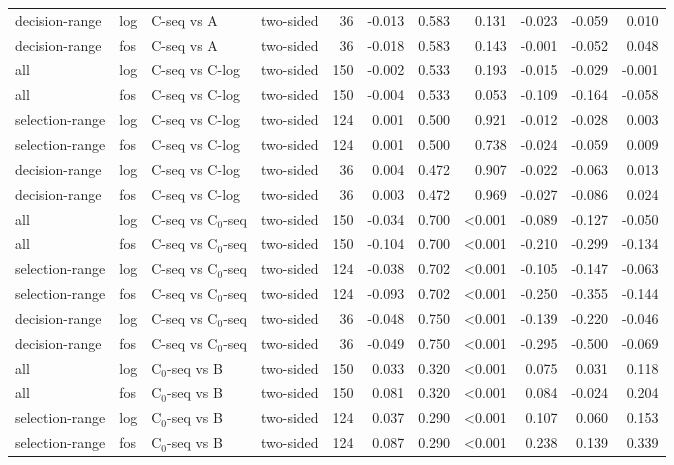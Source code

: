 \begin{longtable}{llllrrrrrrr}
decision-range & log & C-seq vs A & two-sided & 36 & -0.013 & 0.583 & 0.131 & -0.023 & -0.059 & 0.010 \\
decision-range & fos & C-seq vs A & two-sided & 36 & -0.018 & 0.583 & 0.143 & -0.001 & -0.052 & 0.048 \\
all & log & C-seq vs C-log & two-sided & 150 & -0.002 & 0.533 & 0.193 & -0.015 & -0.029 & -0.001 \\
all & fos & C-seq vs C-log & two-sided & 150 & -0.004 & 0.533 & 0.053 & -0.109 & -0.164 & -0.058 \\
selection-range & log & C-seq vs C-log & two-sided & 124 & 0.001 & 0.500 & 0.921 & -0.012 & -0.028 & 0.003 \\
selection-range & fos & C-seq vs C-log & two-sided & 124 & 0.001 & 0.500 & 0.738 & -0.024 & -0.059 & 0.009 \\
decision-range & log & C-seq vs C-log & two-sided & 36 & 0.004 & 0.472 & 0.907 & -0.022 & -0.063 & 0.013 \\
decision-range & fos & C-seq vs C-log & two-sided & 36 & 0.003 & 0.472 & 0.969 & -0.027 & -0.086 & 0.024 \\
all & log & C-seq vs C$_0$-seq & two-sided & 150 & -0.034 & 0.700 & <0.001 & -0.089 & -0.127 & -0.050 \\
all & fos & C-seq vs C$_0$-seq & two-sided & 150 & -0.104 & 0.700 & <0.001 & -0.210 & -0.299 & -0.134 \\
selection-range & log & C-seq vs C$_0$-seq & two-sided & 124 & -0.038 & 0.702 & <0.001 & -0.105 & -0.147 & -0.063 \\
selection-range & fos & C-seq vs C$_0$-seq & two-sided & 124 & -0.093 & 0.702 & <0.001 & -0.250 & -0.355 & -0.144 \\
decision-range & log & C-seq vs C$_0$-seq & two-sided & 36 & -0.048 & 0.750 & <0.001 & -0.139 & -0.220 & -0.046 \\
decision-range & fos & C-seq vs C$_0$-seq & two-sided & 36 & -0.049 & 0.750 & <0.001 & -0.295 & -0.500 & -0.069 \\
all & log & C$_0$-seq vs B & two-sided & 150 & 0.033 & 0.320 & <0.001 & 0.075 & 0.031 & 0.118 \\
all & fos & C$_0$-seq vs B & two-sided & 150 & 0.081 & 0.320 & <0.001 & 0.084 & -0.024 & 0.204 \\
selection-range & log & C$_0$-seq vs B & two-sided & 124 & 0.037 & 0.290 & <0.001 & 0.107 & 0.060 & 0.153 \\
selection-range & fos & C$_0$-seq vs B & two-sided & 124 & 0.087 & 0.290 & <0.001 & 0.238 & 0.139 & 0.339 \\

\end{longtable}
